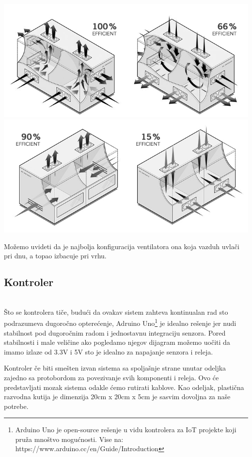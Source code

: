 \documentclass[a4paper,11pt]{book}
\begin{document}
\includegraphics[width=\textwidth]{10060.jpg}
\includegraphics[width=\textwidth]{9015.jpg}

Možemo uvideti da je najbolja konfiguracija ventilatora ona koja vazduh uvlači pri dnu, a topao izbacuje pri vrhu. 

\subsection{Kontroler}
\noindent \\ Što se kontrolera tiče, budući da ovakav sistem zahteva kontinualan rad sto podrazumeva dugoročno opterećenje, Adruino Uno\footnote{Arduino Uno je open-source rešenje u vidu kontrolera za IoT projekte koji pruža mnoštvo mogućnosti. Vise na: https://www.arduino.cc/en/Guide/Introduction} je idealno rešenje jer nudi stabilnost pod dugoročnim radom i jednostavnu integraciju senzora. Pored stabilnosti i male veličine ako pogledamo njegov dijagram možemo uočiti da imamo izlaze od 3.3V i 5V sto je idealno za napajanje senzora i releja.

Kontroler če biti smešten izvan sistema sa spoljašnje strane unutar odeljka zajedno sa protobordom za povezivanje svih komponenti i releja. Ovo će predstavljati mozak sistema odakle ćemo rutirati kablove. Kao odeljak, plastična razvodna kutija je dimenzija 20cm x 20cm x 5cm je sasvim dovoljna za naše potrebe.
\end{document}

